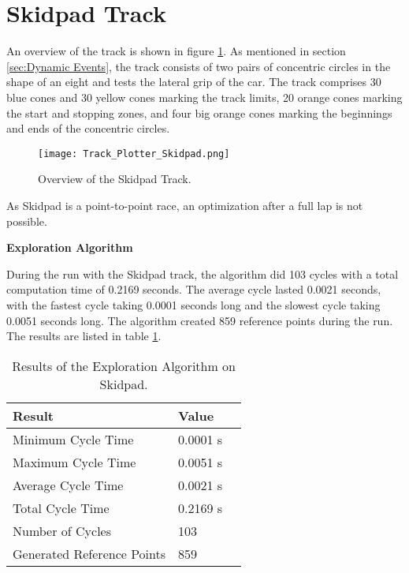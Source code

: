 \section{Skidpad Track} \label{sec:Results Skidpad Track}
An overview of the track is shown in figure \ref{fig:Results Skidpad Initial}. As mentioned in section \ref{sec:Dynamic Events}, the track consists of two pairs of concentric circles in the shape of an eight and tests the lateral grip of the car. The track comprises 30 blue cones and 30 yellow cones marking the track limits, 20 orange cones marking the start and stopping zones, and four big orange cones marking the beginnings and ends of the concentric circles.
\begin{figure}[H]
    \centering
    \texttt{[image: Track\_Plotter\_Skidpad.png]}
    \caption{Overview of the Skidpad Track.}
    \label{fig:Results Skidpad Initial}
\end{figure}

As Skidpad is a point-to-point race, an optimization after a full lap is not possible.

\textbf{Exploration Algorithm}

During the run with the Skidpad track, the algorithm did 103 cycles with a total computation time of 0.2169 seconds. The average cycle lasted 0.0021 seconds, with the fastest cycle taking 0.0001 seconds long and the slowest cycle taking 0.0051 seconds long. The algorithm created 859 reference points during the run. The results are listed in table \ref{tab:Results Skidpad Exploration}.

\begin{table}[H]
    \centering
    \begin{tabular}{|l|l|l|}
        \hline
        \textbf{Result}            & \textbf{Value} \\ \hline
        Minimum Cycle Time         & 0.0001 s       \\ \hline
        Maximum Cycle Time         & 0.0051 s       \\ \hline
        Average Cycle  Time        & 0.0021 s       \\ \hline
        Total Cycle Time           & 0.2169 s       \\ \hline
        Number of Cycles           & 103            \\ \hline
        Generated Reference Points & 859            \\ \hline
    \end{tabular}
    \caption{Results of the Exploration Algorithm on Skidpad.}
    \label{tab:Results Skidpad Exploration}
\end{table}

